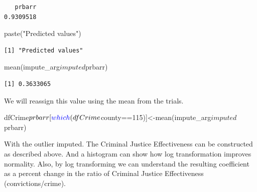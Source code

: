 \documentclass[]{article}
\newenvironment{Shaded}{}{}
\newcommand{\DecValTok}[1]{#1}
\newcommand{\KeywordTok}[1]{\textcolor[rgb]{0.00,0.00,1.00}{#1}}
\newcommand{\NormalTok}[1]{#1}
\newcommand{\OperatorTok}[1]{#1}
\newcommand{\StringTok}[1]{\textcolor[rgb]{0.00,0.50,0.50}{#1}}
\begin{document}
\begin{verbatim}
   prbarr 
0.9309518 
\end{verbatim}

\begin{Shaded}
\begin{Highlighting}[]
\KeywordTok{paste}\NormalTok{(}\StringTok{"Predicted values"}\NormalTok{)}
\end{Highlighting}
\end{Shaded}

\begin{verbatim}
[1] "Predicted values"
\end{verbatim}

\begin{Shaded}
\begin{Highlighting}[]
\KeywordTok{mean}\NormalTok{(impute_arg}\OperatorTok{$}\NormalTok{imputed}\OperatorTok{$}\NormalTok{prbarr)}
\end{Highlighting}
\end{Shaded}

\begin{verbatim}
[1] 0.3633065
\end{verbatim}

We will reassign this value using the mean from the trials.

\begin{Shaded}
\begin{Highlighting}[]
\NormalTok{dfCrime}\OperatorTok{$}\NormalTok{prbarr[}\KeywordTok{which}\NormalTok{(dfCrime}\OperatorTok{$}\NormalTok{county}\OperatorTok{==}\DecValTok{115}\NormalTok{)]<-}\KeywordTok{mean}\NormalTok{(impute_arg}\OperatorTok{$}\NormalTok{imputed}\OperatorTok{$}\NormalTok{prbarr)}
\end{Highlighting}
\end{Shaded}

With the outlier imputed. The Criminal Justice Effectiveness can be
constructed as described above. And a histogram can show how log
transformation improves normality. Also, by log transforming we can
understand the resulting coefficient as a percent change in the ratio of
Criminal Justice Effectiveness (convictions/crime).
\end{document}
